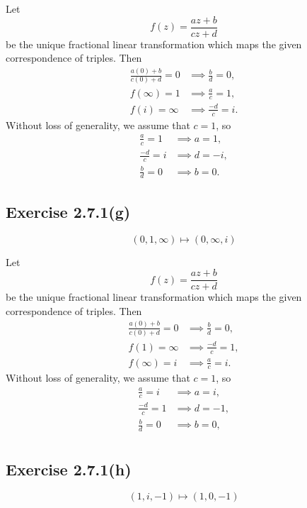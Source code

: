 \documentclass[12pt]{article}
\newenvironment{problem}
    {\begin{lrbox}{\mybox}\begin{minipage}{\textwidth-10pt}}
    {\end{minipage}\end{lrbox}\framebox[6.5in]{\usebox{\mybox}}}
\begin{document}
Let
\[f(z) = \frac{az+b}{cz+d}\]
be the unique fractional linear transformation which maps the given correspondence of triples. Then
\begin{align*}
    \frac{a(0)+b}{c(0)+d} = 0 &\implies \frac{b}{d}=0, \\
    f(\infty) = 1 &\implies \frac{a}{c} = 1, \\
    f(i) = \infty &\implies \frac{-d}{c} = i.
\end{align*}
Without loss of generality, we assume that $c=1$, so
\begin{align*}
    \frac{a}{c} = 1 &\implies a = 1, \\
    \frac{-d}{c} = i &\implies d= - i, \\
    \frac{b}{d}=0 &\implies b=0.
\end{align*}

\subsection*{Exercise 2.7.1(g)}
\begin{problem}
    \[(0, 1, \infty)\mapsto(0, \infty, i)\]
\end{problem}
\medskip

Let
\[f(z) = \frac{az+b}{cz+d}\]
be the unique fractional linear transformation which maps the given correspondence of triples. Then
\begin{align*}
    \frac{a(0)+b}{c(0)+d} = 0 &\implies \frac{b}{d} = 0, \\
    f(1) = \infty &\implies \frac{-d}{c} = 1, \\
    f(\infty) = i &\implies \frac{a}{c} = i.
\end{align*}
Without loss of generality, we assume that $c=1$, so
\begin{align*}
    \frac{a}{c} = i &\implies a=i, \\
    \frac{-d}{c} = 1 &\implies d = -1, \\
    \frac{b}{d} = 0 &\implies b=0, \\
\end{align*}

\subsection*{Exercise 2.7.1(h)}
\begin{problem}
    \[(1, i, -1)\mapsto(1, 0, -1)\]
\end{problem}
\medskip
\end{document}
